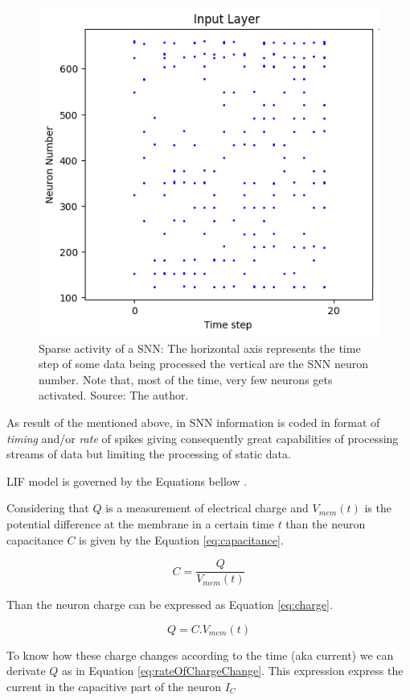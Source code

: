 			\begin{figure}[H]
				\centering
				\includegraphics[width=.5\linewidth]{images/sparsity}
				\caption[Sparse activity of a SNN]{Sparse activity of a SNN: The horizontal axis represents the time step of some data being processed the vertical are the SNN neuron number. Note that, most of the time, very few neurons gets activated. Source: The author.}
				\label{fig:sparsity}
			\end{figure}
			
			\par As result of the mentioned above, in SNN information is coded in format of \textit{timing} and/or \textit{rate} of spikes giving consequently great capabilities of processing streams of data but limiting the processing of static data.\newline
			
			\par LIF model is governed by the Equations bellow \cite{10242251}.
			
			
			\par Considering that $Q$ is a measurement of electrical charge and $V_{mem}(t)$ is the potential difference at the membrane in a certain time $t$ than the neuron capacitance $C$ is given by the Equation \ref{eq:capacitance}.
			
			\begin{equation}
				\label{eq:capacitance}
				C = \frac{Q}{V_{mem}(t)}
			\end{equation}
			
			\par Than the neuron charge can be expressed as Equation \ref{eq:charge}.
			
			\begin{equation}
				\label{eq:charge}
				Q = C.V_{mem}(t)
			\end{equation}
		
			\par To know how these charge changes according to the time (aka current) we can derivate $Q$ as in Equation \ref{eq:rateOfChargeChange}. This expression express the current in the capacitive part of the neuron $I_C$
			
